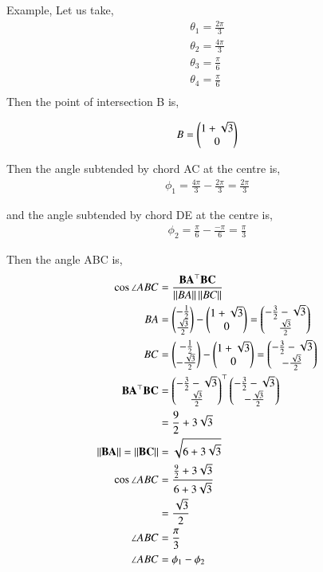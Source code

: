 \documentclass[journal,12pt,twocolumn]{IEEEtran}
\begin{document}
\begin{enumerate}
Example,
Let us take,
		\begin{align}
			\theta_1 = \frac{2\pi}{3}\\
			\theta_2 = \frac{4\pi}{3}\\
			\theta_3 = \frac{\pi}{6}\\
			\theta_4 = \frac{\pi}{6}\\
		\end{align}
Then the point of intersection B is,

		\begin{align}
			B = \begin{pmatrix}1+\sqrt{3}\\0\end{pmatrix}
		\end{align}

Then the angle subtended by chord AC at the centre is,
		\begin{align}
			\phi_1 = \frac{4\pi}{3}-\frac{2\pi}{3} = \frac{2\pi}{3}
		\end{align}

and the angle subtended by chord DE at the centre is,
		\begin{align}
			\phi_2 = \frac{\pi}{6}-\frac{-\pi}{6} = \frac{\pi}{3}
		\end{align}

Then the angle ABC is,
		\begin{align}
			\cos \angle ABC &= \frac{\mathbf{BA}^{\top} \mathbf{BC}}{\left\lVert BA\right\rVert\left\lVert BC\right\rVert}\\
				BA &= \begin{pmatrix}-\frac{1}{2}\\\frac{\sqrt{3}}{2}\end{pmatrix} - \begin{pmatrix}1+\sqrt{3}\\0\end{pmatrix} = \begin{pmatrix}-\frac{3}{2}-\sqrt{3}\\\frac{\sqrt{3}}{2}\end{pmatrix}\\
				BC &= \begin{pmatrix}-\frac{1}{2}\\-\frac{\sqrt{3}}{2}\end{pmatrix} - \begin{pmatrix}1+\sqrt{3}\\0\end{pmatrix} = \begin{pmatrix}-\frac{3}{2}-\sqrt{3}\\-\frac{\sqrt{3}}{2}\end{pmatrix}\\
	  \mathbf{BA}^{\top} \mathbf{BC} &= \begin{pmatrix}-\frac{3}{2}-\sqrt{3}\\\frac{\sqrt{3}}{2}\end{pmatrix}^{\top}\begin{pmatrix}-\frac{3}{2}-\sqrt{3}\\-\frac{\sqrt{3}}{2}\end{pmatrix}\\
			  	   &= \frac{9}{2} + 3\sqrt{3}\\
	\left\lVert\mathbf{BA}\right\rVert = \left\lVert\mathbf{BC}\right\rVert &= \sqrt{6+3\sqrt{3}}\\
			\cos \angle ABC &= \frac{\frac{9}{2}+3\sqrt{3}}{6+3\sqrt{3}}\\
				   &= \frac{\sqrt{3}}{2}\\
			     \angle ABC &= \frac{\pi}{3}\\
			     \angle ABC &= \phi_1-\phi_2
		\end{align}



		\begin{table}[h]
			\centering
			
			\caption{}
			\label{tab:1}
		\end{table}

\end{enumerate}
\end{document}
